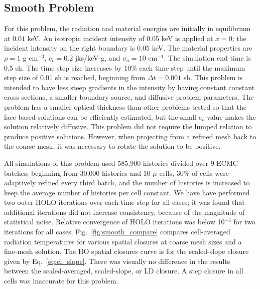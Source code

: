 \subsection{Smooth Problem}

For this problem, the radiation and material energies are initially in
equilibrium at $0.01$ keV.   An isotropic incident intensity of 0.05 keV is applied
at $x=0$; the incident intensity on the right boundary is $0.05$ keV.
The material properties are $\rho = 1$ g cm$^{-3}$, $c_v = 0.2$ jks/keV-g, and
$\sigma_a=10$ cm$^{-1}$.
The simulation end time is 0.5 sh.  The time step size increases by 10\% each time step
until the maximum step size of 0.01 sh is reached, beginning from $\Delta t = 0.001$ sh.
This problem is intended to have less steep gradients in the intensity by having constant constant cross
sections, a smaller boundary source, and diffusive problem parameters.
The problem has a smaller optical thickness than other problems tested so that the face-based solutions can be efficiently
estimated, but the small c$_v$ value makes the solution relatively diffusive.  This
problem did not require the lumped relation to produce positive solutions.
However, when projecting from a refined mesh back to the coarse mesh, it was
necessary to rotate the solution to be positive.

All simulations of this problem used 585,900 histories divided over 9 ECMC
batches;  beginning from 30,000 histories and $10$ $\mu$ cells, 30\% of cells were
adaptively refined every third batch, and the number of histories is increased to
keep the average number of histories per cell constant. 
We have have performed two outer HOLO iterations over each time step for all cases; it was
found that additional iterations did not increase consistency, because of the  magnitude
of statistical noise.  Relative convergence of HOLO iterations was below 10$^{-3}$
for two iterations for all cases.  
Fig.~\ref{fig:smooth_compare} compares cell-averaged radiation temperatures for various spatial closures at
coarse mesh sizes and a fine-mesh solution.  The HO spatial closures curve is for the
scaled-slope closure given by Eq.~\eqref{eq:cl_slope}.  There was visually
no difference in the results between the scaled-averaged, scaled-slope, or LD closure. A step closure in all cells
was inaccurate for this problem.

